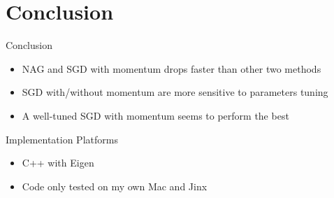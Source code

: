 \documentclass{beamer}
\begin{document}
\section{Conclusion}

\begin{frame}{Conclusion}
\begin{itemize}
\item NAG and SGD with momentum drops faster than other two methods
\item SGD with/without momentum are more sensitive to parameters tuning
\item A well-tuned SGD with momentum seems to perform the best
\end{itemize}
\end{frame}
\begin{frame}{Implementation Platforms}
\begin{itemize}
\item C++ with Eigen
\item Code only tested on my own Mac and Jinx
\end{itemize}

\end{frame}
\end{document}
